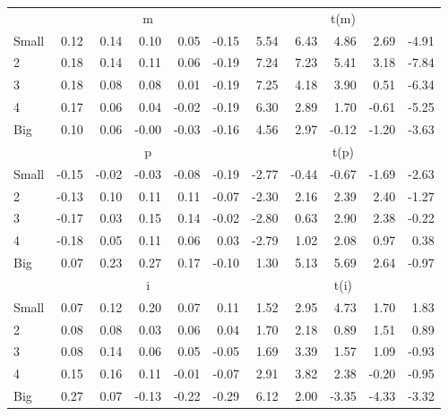 \begin{table}[!ht]
\begin{tabular}{lrrrrrrrrrr}
      & \multicolumn{5}{c}{m} & \multicolumn{5}{c}{t(m)}
    
    \\
      \cmidrule(r){2-6} \cmidrule(r){7-11}

    Small   & 0.12  & 0.14  & 0.10  & 0.05  & -0.15  & 5.54  & 6.43  & 4.86  & 2.69  & -4.91  \\
         2  & 0.18  & 0.14  & 0.11  & 0.06  & -0.19  & 7.24  & 7.23  & 5.41  & 3.18  & -7.84  \\
         3  & 0.18  & 0.08  & 0.08  & 0.01  & -0.19  & 7.25  & 4.18  & 3.90  & 0.51  & -6.34  \\
         4  & 0.17  & 0.06  & 0.04  & -0.02  & -0.19  & 6.30  & 2.89  & 1.70  & -0.61  & -5.25  \\
    Big     & 0.10  & 0.06  & -0.00  & -0.03  & -0.16  & 4.56  & 2.97  & -0.12  & -1.20  & -3.63  \\

  
    
      & \multicolumn{5}{c}{p} & \multicolumn{5}{c}{t(p)}
    
    \\
      \cmidrule(r){2-6} \cmidrule(r){7-11}

    Small   & -0.15  & -0.02  & -0.03  & -0.08  & -0.19  & -2.77  & -0.44  & -0.67  & -1.69  & -2.63  \\
         2  & -0.13  & 0.10  & 0.11  & 0.11  & -0.07  & -2.30  & 2.16  & 2.39  & 2.40  & -1.27  \\
         3  & -0.17  & 0.03  & 0.15  & 0.14  & -0.02  & -2.80  & 0.63  & 2.90  & 2.38  & -0.22  \\
         4  & -0.18  & 0.05  & 0.11  & 0.06  & 0.03  & -2.79  & 1.02  & 2.08  & 0.97  & 0.38  \\
    Big     & 0.07  & 0.23  & 0.27  & 0.17  & -0.10  & 1.30  & 5.13  & 5.69  & 2.64  & -0.97  \\

  
    
      & \multicolumn{5}{c}{i} & \multicolumn{5}{c}{t(i)}
    
    \\
      \cmidrule(r){2-6} \cmidrule(r){7-11}

    Small   & 0.07  & 0.12  & 0.20  & 0.07  & 0.11  & 1.52  & 2.95  & 4.73  & 1.70  & 1.83  \\
         2  & 0.08  & 0.08  & 0.03  & 0.06  & 0.04  & 1.70  & 2.18  & 0.89  & 1.51  & 0.89  \\
         3  & 0.08  & 0.14  & 0.06  & 0.05  & -0.05  & 1.69  & 3.39  & 1.57  & 1.09  & -0.93  \\
         4  & 0.15  & 0.16  & 0.11  & -0.01  & -0.07  & 2.91  & 3.82  & 2.38  & -0.20  & -0.95  \\
    Big     & 0.27  & 0.07  & -0.13  & -0.22  & -0.29  & 6.12  & 2.00  & -3.35  & -4.33  & -3.32  \\

  

  \bottomrule
\end{tabular}
\label{tbl:25_Size_Beta_B16b}
\end{table}